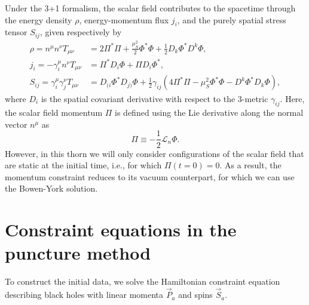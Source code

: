 
Under the 3+1 formalism,
the scalar field contributes to the spacetime through the energy density $\rho$,
energy-momentum flux $j_i$,
and the purely spatial stress tensor $S_{ij}$, given respectively by
\begin{align}
    \rho = n^\mu n^\nu T_{\mu\nu}
    &= 2 \Pi^* \Pi + \frac{\mu_S^2}{2} \Phi^* \Phi
    + \frac{1}{2} D_k\Phi^* D^k \Phi,
    \\
    j_i = -\gamma_i^\mu n^\nu T_{\mu\nu}
    &= \Pi^* D_i\Phi + \Pi D_i\Phi^*,
    \\
    S_{ij} = \gamma_i ^\mu \gamma_j^\nu T_{\mu\nu}
    &= D_{(i}\Phi^* D_{j)}\Phi
    + \frac{1}{2} \gamma_{ij}
    (4\Pi^* \Pi - \mu_S^2 \Phi^* \Phi - D^k\Phi^* D_k\Phi),
\end{align}
where $D_i$ is the spatial covariant derivative with respect to the 3-metric $\gamma_{ij}$.
Here, the scalar field momentum $\Pi$ is defined using the Lie derivative
along the normal vector $n^\mu$ as
\begin{equation}
    \Pi \equiv - \frac{1}{2} \mathcal{L}_n \Phi.
\end{equation}
However, in this thorn we will only consider configurations of the scalar field 
that are static at the initial time, i.e., for which $\Pi(t=0)=0$.
As a result, the momentum constraint reduces to its vacuum counterpart,
for which we can use the Bowen-York solution.

\section{Constraint equations in the puncture method}
To construct the initial data, we solve the Hamiltonian constraint equation
describing black holes with linear momenta $\vec{P}_a$ and spins $\vec{S}_a$.

